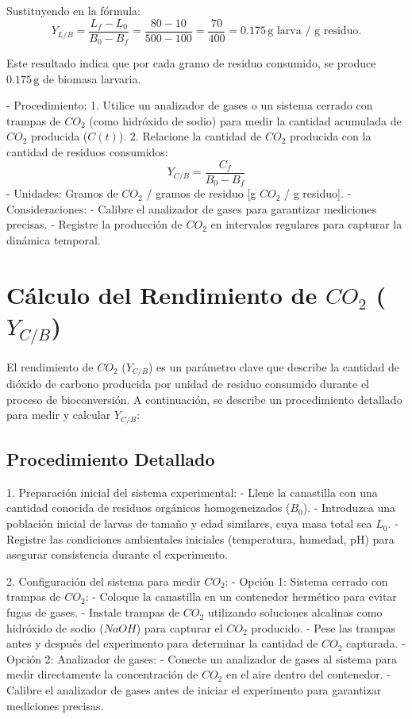\documentclass[12pt]{article}
\begin{document}
Sustituyendo en la fórmula:
\[
Y_{L/B} = \frac{L_f - L_0}{B_0 - B_f} = \frac{80 - 10}{500 - 100} = \frac{70}{400} = 0.175 \, \text{g larva / g residuo}.
\]

Este resultado indica que por cada gramo de residuo consumido, se produce $0.175 \, \text{g}$ de biomasa larvaria.

- Procedimiento:
  1. Utilice un analizador de gases o un sistema cerrado con trampas de $CO_2$ (como hidróxido de sodio) para medir la cantidad acumulada de $CO_2$ producida ($C(t)$).
  2. Relacione la cantidad de $CO_2$ producida con la cantidad de residuos consumidos:
     \[
     Y_{C/B} = \frac{C_f}{B_0 - B_f}
     \]
- Unidades: Gramos de $CO_2$ / gramos de residuo [g $CO_2$ / g residuo].
- Consideraciones:
  - Calibre el analizador de gases para garantizar mediciones precisas.
  - Registre la producción de $CO_2$ en intervalos regulares para capturar la dinámica temporal.

\section{Cálculo del Rendimiento de $CO_2$ ($Y_{C/B}$)}

El rendimiento de $CO_2$ ($Y_{C/B}$) es un parámetro clave que describe la cantidad de dióxido de carbono producida por unidad de residuo consumido durante el proceso de bioconversión. A continuación, se describe un procedimiento detallado para medir y calcular $Y_{C/B}$:

\subsection{Procedimiento Detallado}

1. Preparación inicial del sistema experimental:
   - Llene la canastilla con una cantidad conocida de residuos orgánicos homogeneizados ($B_0$).
   - Introduzca una población inicial de larvas de tamaño y edad similares, cuya masa total sea $L_0$.
   - Registre las condiciones ambientales iniciales (temperatura, humedad, pH) para asegurar consistencia durante el experimento.

2. Configuración del sistema para medir $CO_2$:
   - Opción 1: Sistema cerrado con trampas de $CO_2$:
     - Coloque la canastilla en un contenedor hermético para evitar fugas de gases.
     - Instale trampas de $CO_2$ utilizando soluciones alcalinas como hidróxido de sodio ($NaOH$) para capturar el $CO_2$ producido.
     - Pese las trampas antes y después del experimento para determinar la cantidad de $CO_2$ capturada.
   - Opción 2: Analizador de gases:
     - Conecte un analizador de gases al sistema para medir directamente la concentración de $CO_2$ en el aire dentro del contenedor.
     - Calibre el analizador de gases antes de iniciar el experimento para garantizar mediciones precisas.
\end{document}
